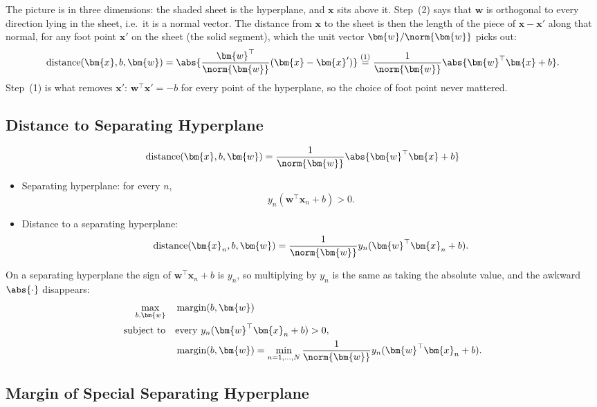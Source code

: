 The picture is in three dimensions: the shaded sheet is the hyperplane, and
\(\bm{x}\) sits above it. Step~(2) says that \(\bm{w}\) is orthogonal to
every direction lying in the sheet, i.e.\ it is a normal vector. The
distance from \(\bm{x}\) to the sheet is then the length of the piece of
\(\bm{x} - \bm{x}'\) along that normal, for any foot point \(\bm{x}'\) on the
sheet (the solid segment), which the unit vector \(\bm{w}/\norm{\bm{w}}\)
picks out:
\[
    \operatorname{distance}(\bm{x}, b, \bm{w})
    = \abs{\frac{\bm{w}^\top}{\norm{\bm{w}}} (\bm{x} - \bm{x}')}
    \overset{(1)}{=} \frac{1}{\norm{\bm{w}}} \abs{\bm{w}^\top \bm{x} + b}.
\]
Step~(1) is what removes \(\bm{x}'\): \(\bm{w}^\top \bm{x}' = -b\) for every
point of the hyperplane, so the choice of foot point never mattered.

\subsection{Distance to Separating Hyperplane}

\[
    \operatorname{distance}(\bm{x}, b, \bm{w}) = \frac{1}{\norm{\bm{w}}}
    \abs{\bm{w}^\top \bm{x} + b}
\]
\begin{itemize}
    \item Separating hyperplane: for every \(n\),
        \[
            y_n (\bm{w}^\top \bm{x}_n + b) > 0.
        \]
    \item Distance to a separating hyperplane:
        \[
            \operatorname{distance}(\bm{x}_n, b, \bm{w}) =
            \frac{1}{\norm{\bm{w}}} y_n (\bm{w}^\top \bm{x}_n + b).
        \]
\end{itemize}
On a separating hyperplane the sign of \(\bm{w}^\top \bm{x}_n + b\) is
\(y_n\), so multiplying by \(y_n\) is the same as taking the absolute value,
and the awkward \(\abs{\cdot}\) disappears:
\begin{equation}\label{eq:lm-margin}
    \begin{aligned}
        \max_{b, \bm{w}} \quad & \operatorname{margin}(b, \bm{w})\\
        \text{subject to} \quad & \text{every } y_n (\bm{w}^\top \bm{x}_n +
            b) > 0,\\
        & \operatorname{margin}(b, \bm{w}) = \min_{n=1,\dots,N}
            \frac{1}{\norm{\bm{w}}} y_n (\bm{w}^\top \bm{x}_n + b).
    \end{aligned}
\end{equation}

\subsection{Margin of Special Separating Hyperplane}

